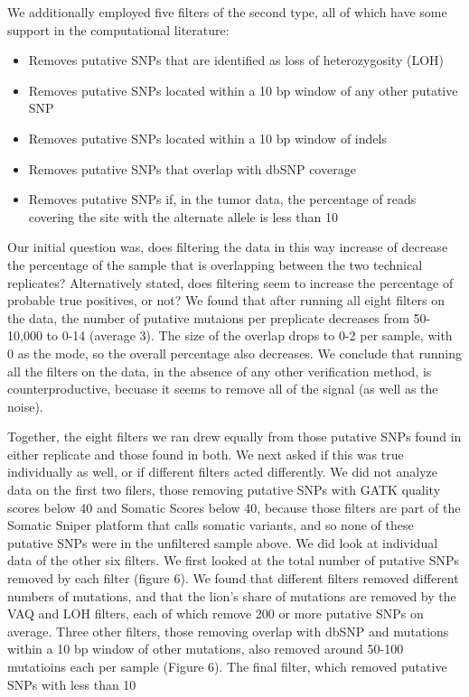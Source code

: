 \documentclass[11pt]{article} %
\begin{document}
We additionally employed five filters of the second type, all of which have some support in the computational literature:

\begin{itemize}
	\item Removes putative SNPs that are identified as loss of heterozygosity (LOH)
	\item Removes putative SNPs located within a 10 bp window of any other putative SNP
	\item Removes putative SNPs located within a 10 bp window of indels
	\item Removes putative SNPs that overlap with dbSNP coverage
	\item Removes putative SNPs if, in the tumor data, the percentage of reads covering the site with the alternate allele is less than 10%
\end{itemize}

Our initial question was, does filtering the data in this way increase of decrease the percentage of the sample that is overlapping between the two technical replicates? Alternatively stated, does filtering seem to increase the percentage of probable true positives, or not? We found that after running all eight filters on the data, the number of putative mutaions per preplicate decreases from 50-10,000 to 0-14 (average 3). The size of the overlap drops to 0-2 per sample, with 0 as the mode, so the overall percentage also decreases. We conclude that running all the filters on the data, in the absence of any other verification method, is counterproductive, becuase it seems to remove all of the signal (as well as the noise). 

Together, the eight filters we ran drew equally from those putative SNPs found in either replicate and those found in both. We next asked if this was true individually as well, or if different filters acted differently. We did not analyze data on the first two filers, those removing putative SNPs with GATK quality scores below 40 and Somatic Scores below 40, because those filters are part of the Somatic Sniper platform that calls somatic variants, and so none of these putative SNPs were in the unfiltered sample above. We did look at individual data of the other six filters. We first looked at the total number of putative SNPs removed by each filter (figure 6). We found that different filters removed different numbers of mutations, and that the lion's share of mutations are removed by the VAQ and LOH filters, each of which remove 200 or more putative SNPs on average. Three other filters, those removing overlap with dbSNP and mutations within a 10 bp window of other mutations, also removed around 50-100 mutatioins each per sample (Figure 6). The final filter, which removed putative SNPs with less than 10%
\end{document}
